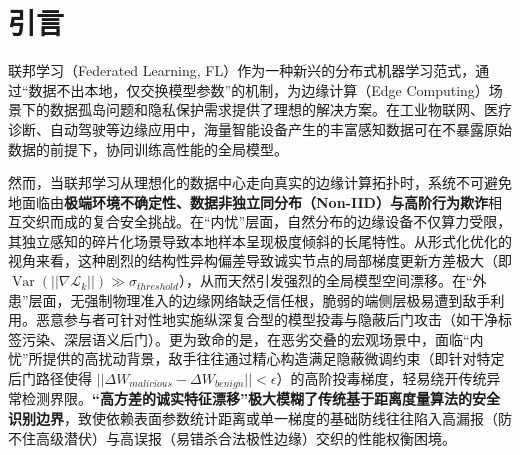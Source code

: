 \documentclass[runningheads]{llncs}
\begin{document}
\def\abstractname{\textbf{中文摘要}}
\begin{abstract}
面向边缘计算场景，联邦学习在提升数据可用性的同时，也面临非独立同分布数据、模型投毒和运行环境不确定性叠加带来的鲁棒性挑战。本文提出一种信任流驱动的可信联邦学习框架，将客户端可信验证、参数内容审查、历史信誉演化、风险状态更新以及分层鲁棒聚合串联为统一的状态闭环。方法上，本文构建了硬门禁与指数衰减结合的信任评分机制，引入服务器优先的纯净参考方向用于贡献度验证，设计历史流与风险流正交更新策略，并在聚合阶段采用风险门控下的逐层准入、二次归一化与动态裁剪机制。基于Flower实现并在CIFAR-10上完成20客户端、6种高危混合攻击的实证。5轮独立实验（$n=5$）统计结果显示：在设定的对抗区间内可有效识别各类恶意客户端，且正常节点永久误杀率维持向零收敛（瞬时可疑率 $<$ 0.01\%）；系统取得了 $92.31\% (\pm 0.09\%)$ 的均值收敛准确率，并将后门攻击成功率（ASR）极值期望控制在 $10.21\% (\pm 0.05\%)$；单次 30 轮仿真基准耗时为 3878.53s。结果表明，信任流正交建模能够在异构边缘环境中提供稳健的恶意节点识别能力。

\end{abstract}

    \section{引言}
联邦学习（Federated Learning, FL）作为一种新兴的分布式机器学习范式，通过“数据不出本地，仅交换模型参数”的机制，为边缘计算（Edge Computing）场景下的数据孤岛问题和隐私保护需求提供了理想的解决方案\cite{kairouz2021flsurvey}。在工业物联网、医疗诊断、自动驾驶等边缘应用中，海量智能设备产生的丰富感知数据可在不暴露原始数据的前提下，协同训练高性能的全局模型。

然而，当联邦学习从理想化的数据中心走向真实的边缘计算拓扑时，系统不可避免地面临由\textbf{极端环境不确定性、数据非独立同分布（Non-IID）与高阶行为欺诈}相互交织而成的复合安全挑战。在“内忧”层面，自然分布的边缘设备不仅算力受限，其独立感知的碎片化场景导致本地样本呈现极度倾斜的长尾特性。从形式化优化的视角来看，这种剧烈的结构性异构偏差导致诚实节点的局部梯度更新方差极大（即 $\operatorname{Var}(|| \nabla \mathcal{L}_k ||) \gg \sigma_{threshold}$），从而天然引发强烈的全局模型空间漂移。在“外患”层面，无强制物理准入的边缘网络缺乏信任根，脆弱的端侧层极易遭到敌手利用。恶意参与者可针对性地实施纵深复合型的模型投毒与隐蔽后门攻击（如干净标签污染、深层语义后门）\cite{gu2017badnets,wang2019neuralcleanse}。更为致命的是，在恶劣交叠的宏观场景中，面临“内忧”所提供的高扰动背景，敌手往往通过精心构造满足隐蔽微调约束（即针对特定后门路径使得 $||\Delta W_{malicious} - \Delta W_{benign}|| < \epsilon$）的高阶投毒梯度，轻易绕开传统异常检测界限。\textbf{“高方差的诚实特征漂移”极大模糊了传统基于距离度量算法的安全识别边界}，致使依赖表面参数统计距离或单一梯度的基础防线往往陷入高漏报（防不住高级潜伏）与高误报（易错杀合法极性边缘）交织的性能权衡困境。
\end{document}
